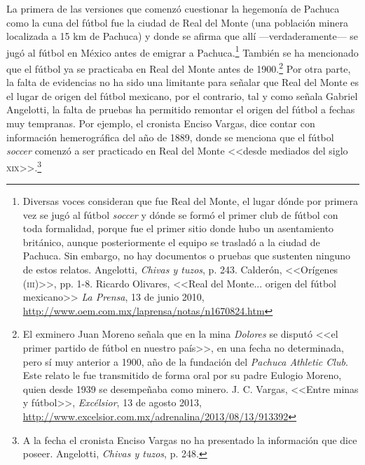 \documentclass[11pt,a5paper,twoside]{book} %
\begin{document}
La primera de las versiones que comenzó cuestionar la hegemonía de Pachuca como
la cuna del fútbol fue la ciudad de Real del Monte (una población minera localizada a 15 km de Pachuca) y donde se afirma que allí ---verdaderamente--- se jugó al fútbol en México antes de emigrar a Pachuca.\footnote{Diversas voces consideran que fue Real del Monte, el lugar dónde por primera vez se jugó al fútbol \emph{soccer} y dónde se formó el primer club de fútbol con toda formalidad, porque fue el primer sitio donde hubo un asentamiento británico, aunque posteriormente el equipo se trasladó a la ciudad de Pachuca. Sin embargo, no hay documentos o pruebas que sustenten ninguno de estos relatos. Angelotti, \emph{Chivas y tuzos}, p. 243. Calderón, <<Orígenes (\textsc{iii})>>, pp. 1-8. Ricardo Olivares, <<Real del Monte... origen del fútbol mexicano>> \emph{La Prensa}, 13 de junio 2010, \url{http://www.oem.com.mx/laprensa/notas/n1670824.htm}} También se ha mencionado que el fútbol ya se practicaba en Real del Monte antes de 1900.\footnote{El exminero Juan Moreno señala que en la mina \emph{Dolores} se disputó <<el primer partido de fútbol en nuestro país>>, en una fecha no determinada, pero sí muy anterior a 1900, año de la fundación del \emph{Pachuca Athletic Club}. Este relato le fue transmitido de forma oral por su padre Eulogio Moreno, quien desde 1939 se desempeñaba como minero. J. C. Vargas, <<Entre minas y fútbol>>, \emph{Excélsior}, 13 de agosto 2013, \url{http://www.excelsior.com.mx/adrenalina/2013/08/13/913392}} Por otra parte, la falta de evidencias no ha sido una limitante para señalar que Real del Monte es el lugar de origen del fútbol mexicano,
por el contrario, tal y como señala Gabriel Angelotti, la falta de pruebas ha permitido remontar el origen del fútbol a fechas muy tempranas. Por ejemplo, el cronista Enciso Vargas,
dice contar con información hemerográfica del año de 1889, donde se menciona que el fútbol \emph{soccer} comenzó a ser practicado en Real del Monte <<desde mediados del siglo \textsc{xix}>>.\footnote{A la fecha el cronista Enciso Vargas no ha presentado la información que dice poseer. Angelotti, \emph{Chivas y tuzos}, p. 248.}
\end{document}
